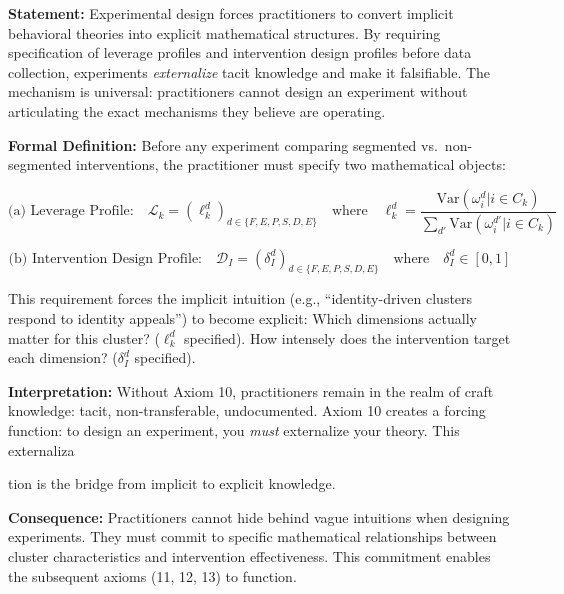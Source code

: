 \begin{tcolorbox}[colback=purple!5!white, colframe=purple!75!black,
    title=Axiom SEG-VAL-10: Theory Externalization Principle]

\textbf{Statement:}
Experimental design forces practitioners to convert implicit behavioral theories into explicit mathematical
structures. By requiring specification of leverage profiles and intervention design profiles before data collection,
experiments \textit{externalize} tacit knowledge and make it falsifiable. The mechanism is universal: practitioners
cannot design an experiment without articulating the exact mechanisms they believe are operating.
\cite{popper1959logic, angrist2010mostly}

\textbf{Formal Definition:}
Before any experiment comparing segmented vs.\ non-segmented interventions, the practitioner must specify
two mathematical objects:

\begin{equation}
\text{(a) Leverage Profile:} \quad \mathcal{L}_k = (\ell_k^d)_{d \in \{F,E,P,S,D,E\}}
\quad \text{where} \quad \ell_k^d = \frac{\text{Var}(\omega_i^d | i \in C_k)}{\sum_{d'} \text{Var}(\omega_i^{d'} | i \in C_k)}
\end{equation}

\begin{equation}
\text{(b) Intervention Design Profile:} \quad \mathcal{D}_I = (\delta_I^d)_{d \in \{F,E,P,S,D,E\}} \quad \text{where} \quad \delta_I^d \in [0,1]
\end{equation}

This requirement forces the implicit intuition (e.g., ``identity-driven clusters respond to identity appeals'')
to become explicit: Which dimensions actually matter for this cluster? ($\ell_k^d$ specified). How intensely does
the intervention target each dimension? ($\delta_I^d$ specified).

\textbf{Interpretation:}
Without Axiom 10, practitioners remain in the realm of craft knowledge: tacit, non-transferable, undocumented.
Axiom 10 creates a forcing function: to design an experiment, you \textit{must} externalize your theory.
This externaliza

tion is the bridge from implicit to explicit knowledge.

\textbf{Consequence:}
Practitioners cannot hide behind vague intuitions when designing experiments. They must commit to specific
mathematical relationships between cluster characteristics and intervention effectiveness. This commitment
enables the subsequent axioms (11, 12, 13) to function.

\end{tcolorbox}


